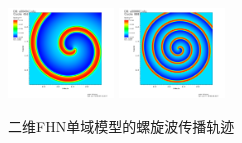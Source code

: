 \documentclass[twoside,UTF8]{nputhesis}
\begin{document}
\begin{figure}[htb]
	\centering
	\includegraphics[width=0.25\textwidth,height=0.2\textwidth]{figures/4361.jpg}
	\hspace{0.2\textwidth}
	\includegraphics[width=0.25\textwidth,height=0.2\textwidth]{figures/8880.jpg}
	\hspace{0.2\textwidth}
	\hspace{0.2\textwidth}
	\caption{二维FHN单域模型的螺旋波传播轨迹}
	\label{fig1}
\end{figure}
\end{document}
